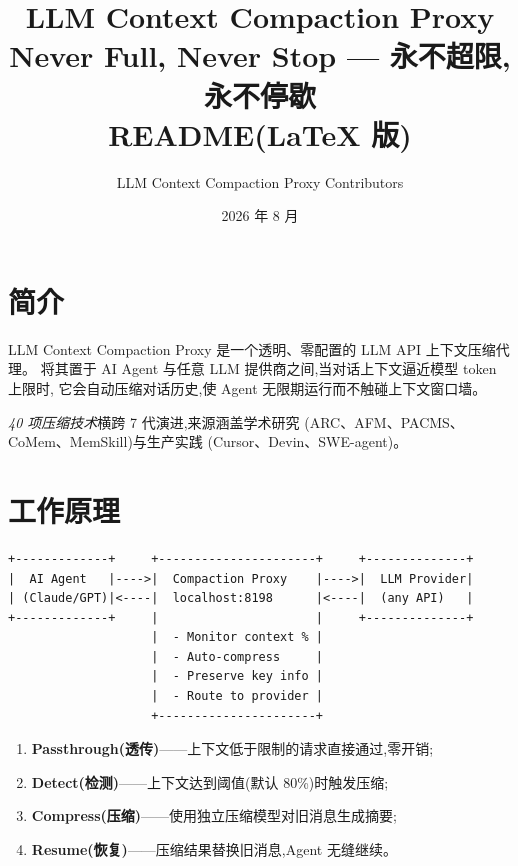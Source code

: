 \documentclass[11pt,a4paper]{article}
\title{\textbf{LLM Context Compaction Proxy}\\[0.3em]
\large Never Full, Never Stop — 永不超限,永不停歇\\[0.3em]
\large README(LaTeX 版)}
\author{LLM Context Compaction Proxy Contributors}
\date{2026 年 8 月}
\begin{document}
\maketitle

\section{简介}

LLM Context Compaction Proxy 是一个透明、零配置的 LLM API 上下文压缩代理。
将其置于 AI Agent 与任意 LLM 提供商之间,当对话上下文逼近模型 token 上限时,
它会自动压缩对话历史,使 Agent 无限期运行而不触碰上下文窗口墙。

\emph{40 项压缩技术}横跨 7 代演进,来源涵盖学术研究
(ARC、AFM、PACMS、CoMem、MemSkill)与生产实践
(Cursor、Devin、SWE-agent)。

\section{工作原理}

\begin{verbatim}
+-------------+     +----------------------+     +--------------+
|  AI Agent   |---->|  Compaction Proxy    |---->|  LLM Provider|
| (Claude/GPT)|<----|  localhost:8198      |<----|  (any API)   |
+-------------+     |                      |     +--------------+
                    |  - Monitor context % |
                    |  - Auto-compress     |
                    |  - Preserve key info |
                    |  - Route to provider |
                    +----------------------+
\end{verbatim}

\begin{enumerate}[leftmargin=2em]
  \item \textbf{Passthrough(透传)}——上下文低于限制的请求直接通过,零开销;
  \item \textbf{Detect(检测)}——上下文达到阈值(默认 80\%)时触发压缩;
  \item \textbf{Compress(压缩)}——使用独立压缩模型对旧消息生成摘要;
  \item \textbf{Resume(恢复)}——压缩结果替换旧消息,Agent 无缝继续。
\end{enumerate}

\end{document}
